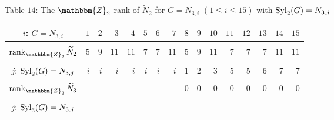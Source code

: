 \documentclass{amsart}
\theoremstyle{plain}
\theoremstyle{definition}
\theoremstyle{remark}
\newcommand{\bZ}{\mathbbm{Z}}\newcommand{\bQ}{\mathbbm{Q}}
\newcommand{\Syl}{{\rm Syl}}
\begin{document}
Table $14$: 
The $\bZ_2$-rank of $\widetilde{N}_2$ for $G=N_{3,i}$ $(1\leq i\leq 15)$ with $\Syl_2(G)=N_{3,j}$
{\small 
\begin{longtable}{c|rrrrrrrrrrrrrrr}
$i$: $G=N_{3,i}$ & $1$ & $2$ & $3$ & $4$ & $5$ & $6$ & $7$ & $8$ & $9$ & $10$ & $11$ & $12$ & $13$ & $14$ & $15$\\\hline
\vspace*{-3mm}\\
${\rm rank}_{\bZ_2}\, \widetilde{N}_2$ & $5$ & $9$ & $11$ & $11$ & $7$ & $7$ & $11$ & $5$ & $9$ & $11$ & $7$ & $7$ & $7$ & $11$ & $11$\\
\vspace*{-3mm}\\
$j$: $\Syl_2(G)=N_{3,j}$ & $i$ & $i$ & $i$ & $i$ & $i$ & $i$ & $i$ & $1$ & $2$ & $3$ & $5$ & $5$ & $6$ & $7$ & $7$\\
\vspace*{-3mm}\\
${\rm rank}_{\bZ_3}\, \widetilde{N}_3$ &  &  &  &  &  &  &  & $0$ & $0$ & $0$ & $0$ & $0$ & $0$ & $0$ & $0$\\
\vspace*{-3mm}\\
$j$: $\Syl_3(G)=N_{3,j}$ &  &  &  &  &  &  &  & -- & -- & -- & -- & -- & -- & -- & --
\end{longtable}
}
\end{document}
